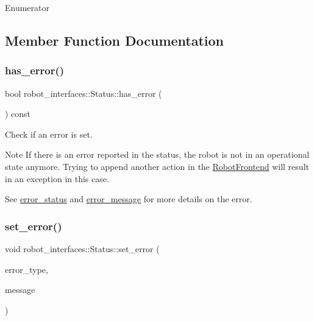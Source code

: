 \begin{DoxyEnumFields}{Enumerator}
\end{DoxyEnumFields}


\subsection{Member Function Documentation}
\mbox{\label{structrobot__interfaces_1_1Status_a83507b0921dc1e67e690b34daa3bcbc3}} 
\subsubsection{\texorpdfstring{has\+\_\+error()}{has\_error()}}
{\footnotesize\ttfamily bool robot\+\_\+interfaces\+::\+Status\+::has\+\_\+error (\begin{DoxyParamCaption}{ }\end{DoxyParamCaption}) const\hspace{0.3cm}{\ttfamily [inline]}}



Check if an error is set. 

\begin{DoxyNote}{Note}
If there is an error reported in the status, the robot is not in an operational state anymore. Trying to append another action in the \hyperlink{classrobot__interfaces_1_1RobotFrontend}{Robot\+Frontend} will result in an exception in this case.
\end{DoxyNote}
See \hyperlink{structrobot__interfaces_1_1Status_a80ffe66121d425d48386b39984cd4c7b}{error\+\_\+status} and \hyperlink{structrobot__interfaces_1_1Status_a7da10fb73cd19f2840c438d321eac744}{error\+\_\+message} for more details on the error. \mbox{\label{structrobot__interfaces_1_1Status_aa5bbec49d6faba7507abc8772dec505d}} 
\subsubsection{\texorpdfstring{set\+\_\+error()}{set\_error()}}
{\footnotesize\ttfamily void robot\+\_\+interfaces\+::\+Status\+::set\+\_\+error (\begin{DoxyParamCaption}\item[{\hyperlink{structrobot__interfaces_1_1Status_a88f1cb8387648815ca75754985bdb3b6}{Error\+Status}}]{error\+\_\+type,  }\item[{const std\+::string \&}]{message }\end{DoxyParamCaption})\hspace{0.3cm}{\ttfamily [inline]}}



